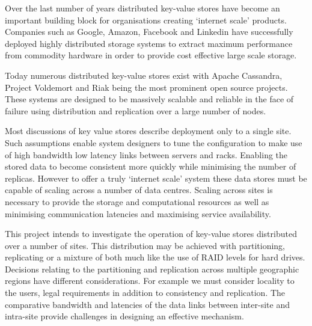 Over the last number of years distributed key-value stores have become an important building block for organisations creating `internet scale' products. Companies such as Google, Amazon, Facebook and Linkedin have successfully deployed highly distributed storage systems to extract maximum performance from commodity hardware in order to provide cost effective large scale storage.

Today numerous distributed key-value stores exist with Apache Cassandra, Project Voldemort and Riak being the most prominent open source projects. These systems are designed to be massively scalable and reliable in the face of failure using distribution and replication over a large number of nodes. 

Most discussions of key value stores describe deployment only to a single site. Such assumptions enable system designers to tune the configuration to make use of high bandwidth low latency links between servers and racks. Enabling the stored data to become consistent  more quickly while minimising the number of replicas. However to offer a truly `internet scale' system these data stores must be capable of scaling across a number of data centres. Scaling across sites is necessary to provide the storage and computational resources as well as minimising communication latencies and maximising service availability.

This project intends to investigate the operation of key-value stores distributed over a number of sites. This distribution may be achieved with partitioning, replicating or a mixture of both much like the use of RAID levels for hard drives. Decisions relating to the partitioning and replication across multiple geographic regions have different considerations. For example we must consider locality to the users, legal requirements in addition to consistency and replication. The comparative bandwidth and latencies of the data links between inter-site and intra-site provide challenges in designing an effective mechanism. 
